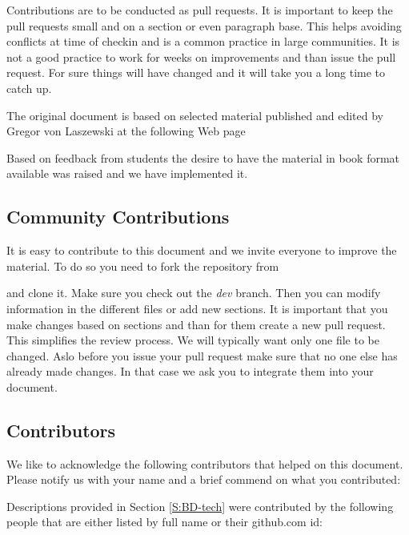 Contributions are to be conducted as pull requests. It is important to
keep the pull requests small and on a section or even paragraph
base. This helps avoiding conflicts at time of checkin and is a common
practice in large communities. It is not a good practice to work for
weeks on improvements and than issue the pull request. For sure things
will have changed and it will take you a long time to catch up.

The original document is based on selected material published and edited by Gregor von
Laszewski at the following Web page


Based on feedback from students the desire to have the material in
book format available was raised and we have implemented it.


\subsection{Community Contributions}

It is easy to contribute to this document and we invite everyone to
improve the material. To do so you need to fork the repository from 


and clone it. Make sure you check out the {\em dev} branch. Then you
can modify information in the different files or add new sections. It
is important that you make changes based on sections and than for them
create a new pull request. This simplifies the review process. We will
typically want only one file to be changed. Aslo before you issue your
pull request make sure that no one else has already made changes. In
that case we ask you to integrate them into your document.


\subsection{Contributors}

We like to acknowledge the following contributors that helped on this
document. Please notify us with your name and a brief commend on what
you contributed:

Descriptions provided in Section \ref{S:BD-tech} were contributed by the
following people that are either listed by full name or their
github.com id:

